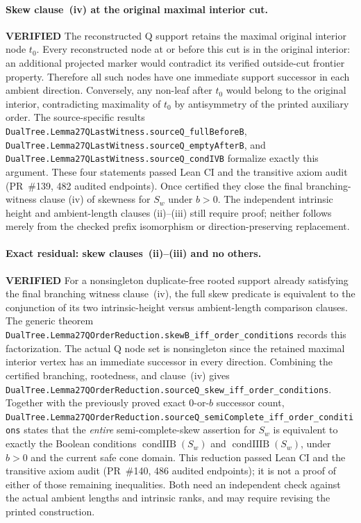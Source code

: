 \documentclass[11pt]{article}
\newcommand{\ok}{\textcolor{green!40!black}{\textbf{VERIFIED}}}
\newcommand{\lean}[1]{\texttt{#1}}
\begin{document}
\paragraph{Skew clause~(iv) at the original maximal interior cut.} \ok
The reconstructed Q support retains the maximal original interior
node $t_0$. Every reconstructed node at or before this cut
is in the original interior: an additional projected marker would
contradict its verified outside-cut frontier property.
Therefore all such nodes have one immediate support successor
in each ambient direction.
Conversely, any non-leaf after $t_0$ would belong to the original
interior, contradicting maximality of $t_0$ by antisymmetry
of the printed auxiliary order.
The source-specific results
\lean{DualTree.Lemma27QLastWitness.sourceQ_fullBeforeB},
\lean{DualTree.Lemma27QLastWitness.sourceQ_emptyAfterB},
and \lean{DualTree.Lemma27QLastWitness.sourceQ_condIVB}
formalize exactly this argument. These four statements passed Lean CI
and the transitive axiom audit (PR~\#139, 482 audited endpoints).
Once certified they close the final branching-witness clause
(iv) of skewness for $S_w$ under $b>0$. The independent intrinsic
height and ambient-length clauses (ii)--(iii) still require proof;
neither follows merely from the checked prefix isomorphism or
direction-preserving replacement.

\paragraph{Exact residual: skew clauses~(ii)--(iii) and no others.} \ok
For a nonsingleton duplicate-free rooted support already satisfying
the final branching witness clause~(iv), the full skew predicate is
equivalent to the conjunction of its two intrinsic-height versus
ambient-length comparison clauses.  The generic theorem
\lean{DualTree.Lemma27QOrderReduction.skewB_iff_order_conditions}
records this factorization.
The actual Q node set is nonsingleton since the retained maximal
interior vertex has an immediate successor in every direction.
Combining the certified branching, rootedness, and clause~(iv)
gives \lean{DualTree.Lemma27QOrderReduction.sourceQ_skew_iff_order_conditions}.
Together with the previously proved exact $0$-or-$b$ successor count,
\lean{DualTree.Lemma27QOrderReduction.sourceQ_semiComplete_iff_order_conditions}
states that the \emph{entire} semi-complete-skew assertion for $S_w$
is equivalent to exactly the Boolean conditions
$\operatorname{condIIB}(S_w)$ and $\operatorname{condIIIB}(S_w)$,
under $b>0$ and the current safe cone domain.
This reduction passed Lean CI and the transitive axiom audit
(PR~\#140, 486 audited endpoints); it is not a proof of either
of those remaining inequalities. Both need an independent check
against the actual ambient lengths and intrinsic ranks, and
may require revising the printed construction.
\end{document}
